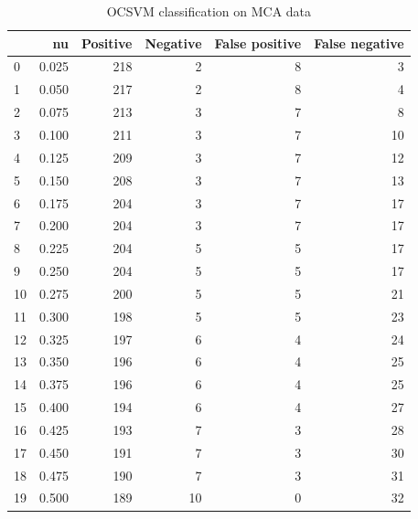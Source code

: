 \documentclass[a4paper,twoside,12pt]{book}
\begin{document}
\begin{appendices}
\begin{table}
	\centering
	\caption{OCSVM classification on MCA data}
	\label{id:tab:OCSVMonMCA}
	\begin{tabular}{lrrrrr}
		\toprule
		{} &     nu &  Positive &  Negative &  False positive &  False negative \\
		\midrule
		0  &  0.025 &       218 &         2 &               8 &               3 \\
		1  &  0.050 &       217 &         2 &               8 &               4 \\
		2  &  0.075 &       213 &         3 &               7 &               8 \\
		3  &  0.100 &       211 &         3 &               7 &              10 \\
		4  &  0.125 &       209 &         3 &               7 &              12 \\
		5  &  0.150 &       208 &         3 &               7 &              13 \\
		6  &  0.175 &       204 &         3 &               7 &              17 \\
		7  &  0.200 &       204 &         3 &               7 &              17 \\
		8  &  0.225 &       204 &         5 &               5 &              17 \\
		9  &  0.250 &       204 &         5 &               5 &              17 \\
		10 &  0.275 &       200 &         5 &               5 &              21 \\
		11 &  0.300 &       198 &         5 &               5 &              23 \\
		12 &  0.325 &       197 &         6 &               4 &              24 \\
		13 &  0.350 &       196 &         6 &               4 &              25 \\
		14 &  0.375 &       196 &         6 &               4 &              25 \\
		15 &  0.400 &       194 &         6 &               4 &              27 \\
		16 &  0.425 &       193 &         7 &               3 &              28 \\
		17 &  0.450 &       191 &         7 &               3 &              30 \\
		18 &  0.475 &       190 &         7 &               3 &              31 \\
		19 &  0.500 &       189 &        10 &               0 &              32 \\

\end{tabular}
\end{table}
\end{appendices}
\end{document}
